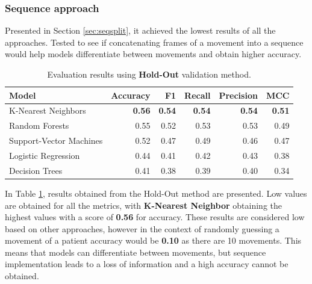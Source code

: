             \subsubsection{Sequence approach}

                Presented in Section \ref{sec:seqsplit}, it achieved the lowest results of all the approaches. Tested to see if concatenating frames of a movement into a sequence would help models differentiate between movements and obtain higher accuracy. 
                
                \begin{table}[htbp]
                    \centering
                    \begin{tabular}{lrrrrr}
                        \toprule
                        \textbf{Model} & \textbf{Accuracy} & \textbf{F1} & \textbf{Recall} & \textbf{Precision} & \textbf{MCC} \\
                        \midrule
                        K-Nearest Neighbors & \textbf{0.56} & \textbf{0.54} & \textbf{0.54} & \textbf{0.54} & \textbf{0.51} \\
                        Random Forests & 0.55 & 0.52 & 0.53 & 0.53 & 0.49 \\
                        Support-Vector Machines& 0.52 & 0.47 & 0.49 & 0.46 & 0.47 \\
                        Logistic Regression & 0.44 & 0.41 & 0.42 & 0.43 & 0.38 \\
                        Decision Trees & 0.41 & 0.38 & 0.39 & 0.40 & 0.34 \\
                        \bottomrule
                    \end{tabular}
                    \caption{Evaluation results using \textbf{Hold-Out} validation method.}
                    \label{tab:sequence_approach_holdout}
                \end{table}

                In Table \ref{tab:sequence_approach_holdout}, results obtained from the Hold-Out method are presented. Low values are obtained for all the metrics, with \textbf{K-Nearest Neighbor} obtaining the highest values with a score of \textbf{0.56} for accuracy. These results are considered low based on other approaches, however in the context of randomly guessing a movement of a patient accuracy would be \textbf{0.10} as there are 10 movements. This means that models can differentiate between movements, but sequence implementation leads to a loss of information and a high accuracy cannot be obtained.

